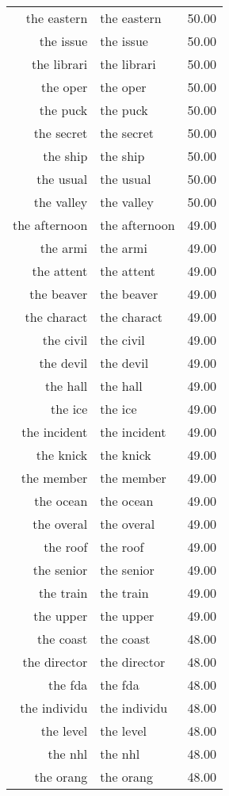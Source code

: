 \begin{table}[ht]
\begin{tabular}{rlr}
  the eastern & the eastern & 50.00 \\ 
  the issue & the issue & 50.00 \\ 
  the librari & the librari & 50.00 \\ 
  the oper & the oper & 50.00 \\ 
  the puck & the puck & 50.00 \\ 
  the secret & the secret & 50.00 \\ 
  the ship & the ship & 50.00 \\ 
  the usual & the usual & 50.00 \\ 
  the valley & the valley & 50.00 \\ 
  the afternoon & the afternoon & 49.00 \\ 
  the armi & the armi & 49.00 \\ 
  the attent & the attent & 49.00 \\ 
  the beaver & the beaver & 49.00 \\ 
  the charact & the charact & 49.00 \\ 
  the civil & the civil & 49.00 \\ 
  the devil & the devil & 49.00 \\ 
  the hall & the hall & 49.00 \\ 
  the ice & the ice & 49.00 \\ 
  the incident & the incident & 49.00 \\ 
  the knick & the knick & 49.00 \\ 
  the member & the member & 49.00 \\ 
  the ocean & the ocean & 49.00 \\ 
  the overal & the overal & 49.00 \\ 
  the roof & the roof & 49.00 \\ 
  the senior & the senior & 49.00 \\ 
  the train & the train & 49.00 \\ 
  the upper & the upper & 49.00 \\ 
  the coast & the coast & 48.00 \\ 
  the director & the director & 48.00 \\ 
  the fda & the fda & 48.00 \\ 
  the individu & the individu & 48.00 \\ 
  the level & the level & 48.00 \\ 
  the nhl & the nhl & 48.00 \\ 
  the orang & the orang & 48.00 \\ 

\end{tabular}
\end{table}
